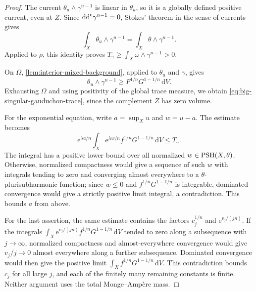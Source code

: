 \begin{proof}
The current $\theta_u\wedge\gamma^{n-1}$ is linear in $\theta_u$, so it is a globally defined positive current, even at $Z$. Since $\mathrm{dd}^{\mathrm{c}}\gamma^{n-1}=0$, Stokes' theorem in the sense of currents gives
\[
 \int_X\theta_u\wedge\gamma^{n-1}
 =\int_X\theta\wedge\gamma^{n-1}.
\]
Applied to $\rho$, this identity proves $T_\gamma\geq\int_X\omega\wedge\gamma^{n-1}>0$.

On $\Omega$, \cref{lem:interior-mixed-background}, applied to $\theta_u$ and $\gamma$, gives
\[
 \theta_u\wedge\gamma^{n-1}\geq
 F^{1/n}G^{1-1/n}\,\mathrm{d}V.
\]
Exhausting $\Omega$ and using positivity of the global trace measure, we obtain \eqref{eq:big-singular-gauduchon-trace}, since the complement $Z$ has zero volume.

For the exponential equation, write $a=\sup_Xu$ and $w=u-a$. The estimate becomes
\[
 \mathrm{e}^{\lambda a/n}\int_X\mathrm{e}^{\lambda w/n}f^{1/n}G^{1-1/n}\,\mathrm{d}V
 \leq T_\gamma.
\]
The integral has a positive lower bound over all normalized $w\in\mathrm{PSH}(X,\theta)$. Otherwise, normalized compactness would give a sequence of such $w$ with integrals tending to zero and converging almost everywhere to a $\theta$-plurisubharmonic function; since $w\leq0$ and $f^{1/n}G^{1-1/n}$ is integrable, dominated convergence would give a strictly positive limit integral, a contradiction. This bounds $a$ from above.

For the last assertion, the same estimate contains the factors $c_j^{1/n}$ and $\mathrm{e}^{v_j/(jn)}$. If the integrals $\int_X\mathrm{e}^{v_j/(jn)}f^{1/n}G^{1-1/n}\,\mathrm{d}V$ tended to zero along a subsequence with $j\to\infty$, normalized compactness and almost-everywhere convergence would give $v_j/j\to0$ almost everywhere along a further subsequence. Dominated convergence would then give the positive limit $\int_Xf^{1/n}G^{1-1/n}\,\mathrm{d}V$. This contradiction bounds $c_j$ for all large $j$, and each of the finitely many remaining constants is finite. Neither argument uses the total Monge--Amp\`ere mass.
\end{proof}

